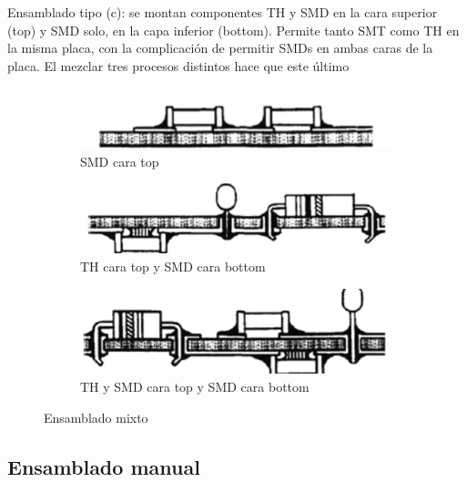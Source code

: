 Ensamblado tipo (c): se montan componentes TH y SMD en la cara superior (top) y SMD solo, en la capa inferior (bottom). Permite tanto SMT como TH en la misma placa, con la complicación de permitir SMDs en ambas caras de la placa. El mezclar tres procesos distintos hace que este último 

\begin{figure}
    \centering
    \begin{subfigure}[c]{0.3 \textwidth}
        \centering
        \includegraphics[width = \textwidth]{Imagenes/Ensamblado PCI - Mixto A.png}
        \caption{SMD cara top}
    \end{subfigure}
    \hfill
    \begin{subfigure}[c]{0.3 \textwidth}
        \centering
        \includegraphics[width = \textwidth]{Imagenes/Encamblado PCI - Mixto B.png}
        \caption{TH cara top y SMD cara bottom}
    \end{subfigure}
    \hfill
    \begin{subfigure}[c]{0.3 \textwidth}
        \centering
        \includegraphics[width = \textwidth]{Imagenes/Ensamblado PCI - Mixto C.png}
        \caption{TH y SMD cara top y SMD cara bottom }
    \end{subfigure}
    \caption{Ensamblado mixto}
\end{figure}

\subsection{Ensamblado manual}

